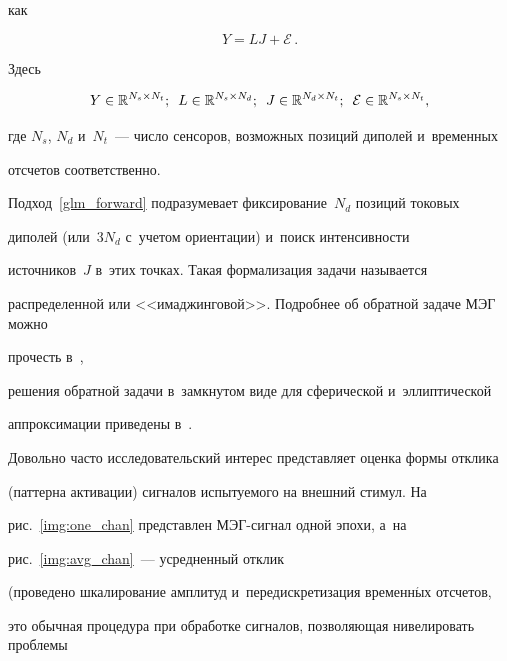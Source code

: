 как


\begin{equation}


Y = LJ + \mathcal{E}\,.


\label{glm_forward}


\end{equation}


Здесь


$$


Y \in \mathbb{R}^{N_s \times N_t};\enskip


L \in \mathbb{R}^{N_s \times N_d};\enskip


J\in \mathbb{R}^{N_d \times N_t};\enskip 


\mathcal{E} \in \mathbb{R}^{N_s \times N_t},


$$ 


где $N_s$, $N_d$ и~$N_t$~--- число сенсоров, возможных позиций диполей и~временных 


отсчетов соответственно.








Подход~\eqref{glm_forward} подразумевает фиксирование~$N_d$ позиций токовых 


диполей (или~$3 N_d$ с~учетом ориентации) и~поиск интенсивности 


источников~$J$ в~этих точках. Такая формализация задачи называется 


распределенной или <<имаджинговой>>. Подробнее об обратной задаче МЭГ можно 


прочесть в~\cite{bayes_inverse},


решения обратной задачи в~замкнутом виде для сферической и~эллиптической 


аппроксимации приведены в~\cite{inverse_elips, inverse_spher}.





Довольно часто исследовательский интерес представляет оценка формы отклика 


(паттерна активации) сигналов испытуемого на внешний стимул. На 


рис.~\ref{img:one_chan} представлен МЭГ-сигнал одной эпохи, а~на 


рис.~\ref{img:avg_chan}~--- усредненный отклик


(проведено шкалирование амплитуд и~передискретизация временн$\acute{\mbox{ы}}$х отсчетов, 


это обычная процедура при обработке сигналов, позволяющая нивелировать проб\-ле\-мы 


